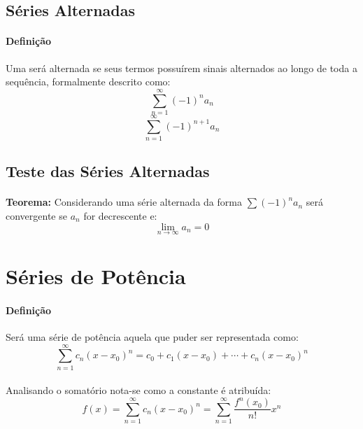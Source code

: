 \documentclass{article}
\begin{document}
        \subsection{Séries Alternadas}
            \paragraph{Definição}Uma será alternada se seus termos possuírem sinais alternados ao longo de toda a sequência, formalmente descrito como:
                \begin{equation}
                    \sum\limits_{n=1}^{\infty}(-1)^{n}a_{n}
                \end{equation}
                \begin{equation}
                    \sum\limits_{n=1}^{\infty}(-1)^{n+1}a_{n}
                \end{equation}
        
        \subsection{Teste das Séries Alternadas}
            \paragraph{}\textbf{Teorema:} Considerando uma série alternada da forma $\sum {(-1)}^{n}a_{n}$ será convergente se $a_{n}$ for decrescente e:
                \begin{equation}
                    \lim_{n\to\infty}a_{n}=0
                \end{equation}
                
        \section{Séries de Potência}
            \paragraph{Definição}Será uma série de potência aquela que puder ser representada como:
                \begin{equation}
                    \sum\limits_{n=1}^{\infty}c_{n}{(x-x_{0})}^{n}=c_{0}+c_{1}{(x-x_{0})}+\cdots+c_{n}{(x-x_{0})}^{n}
                \end{equation}
            \paragraph{}Analisando o somatório nota-se como a constante é atribuída:
                \begin{equation}
                    f(x)=\sum\limits_{n=1}^{\infty}c_{n}{(x-x_{0})}^{n}=\sum\limits_{n=1}^{\infty}\frac{f^{n}(x_{0})}{n!}{x}^{n}
                \end{equation}
\end{document}
